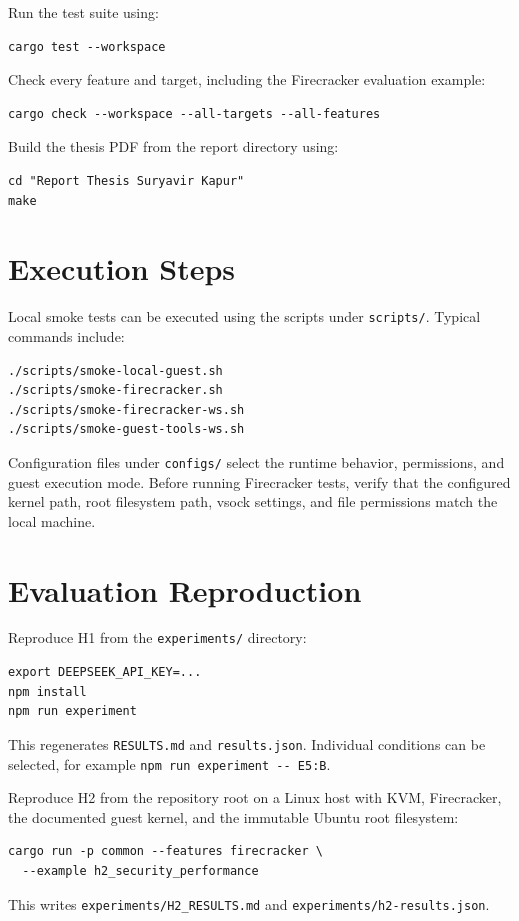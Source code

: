 Run the test suite using:
\begin{verbatim}
cargo test --workspace
\end{verbatim}

Check every feature and target, including the Firecracker evaluation example:
\begin{verbatim}
cargo check --workspace --all-targets --all-features
\end{verbatim}

Build the thesis PDF from the report directory using:
\begin{verbatim}
cd "Report Thesis Suryavir Kapur"
make
\end{verbatim}

\section{Execution Steps}
Local smoke tests can be executed using the scripts under \texttt{scripts/}.
Typical commands include:
\begin{verbatim}
./scripts/smoke-local-guest.sh
./scripts/smoke-firecracker.sh
./scripts/smoke-firecracker-ws.sh
./scripts/smoke-guest-tools-ws.sh
\end{verbatim}

Configuration files under \texttt{configs/} select the runtime behavior,
permissions, and guest execution mode. Before running Firecracker tests, verify
that the configured kernel path, root filesystem path, vsock settings, and file
permissions match the local machine.

\section{Evaluation Reproduction}
Reproduce H1 from the \texttt{experiments/} directory:
\begin{verbatim}
export DEEPSEEK_API_KEY=...
npm install
npm run experiment
\end{verbatim}
This regenerates \texttt{RESULTS.md} and \texttt{results.json}. Individual
conditions can be selected, for example \texttt{npm run experiment -{}- E5:B}.

Reproduce H2 from the repository root on a Linux host with KVM, Firecracker,
the documented guest kernel, and the immutable Ubuntu root filesystem:
\begin{verbatim}
cargo run -p common --features firecracker \
  --example h2_security_performance
\end{verbatim}
This writes \texttt{experiments/H2\_RESULTS.md} and
\texttt{experiments/h2-results.json}.

